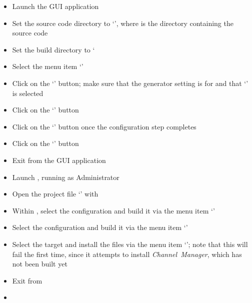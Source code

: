 \begin{itemize}
\item Launch the  GUI application
\item\exSp{} Set the source code directory to `',
where  is the directory containing the \mplusm{} source code
\item\exSp{} Set the build directory to `
\item\exSp{} Select the menu item `'
\item\exSp{} Click on the `' button; make sure that the generator
setting is for  and that `' is
selected
\item\exSp{} Click on the `' button
\item\exSp{} Click on the `' button once the configuration step
completes
\item\exSp{} Click on the `' button
\item\exSp{} Exit from the  GUI application
\item\exSp{} Launch , running as Administrator
\item\exSp{} Open the project file
`' with
\item\exSp{} Within , select the  configuration and
build it via the menu item `'
\item\exSp{} Select the  configuration and build it via the menu item
`'
\item\exSp{} Select the  target and install the  files via
the menu item `'; note that this will fail the first time, since it attempts to install
\textit{Channel~Manager}, which has not been built yet
\item\exSp{} Exit from 
\end{itemize}
\tertiaryEnd{}
\begin{itemize}
\item\TBD{}
\end{itemize}
